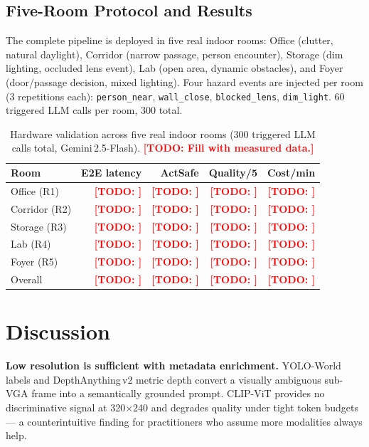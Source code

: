\documentclass[journal]{IEEEtran}
\newcommand{\todo}[1]{\textcolor{red}{\textbf{[TODO: #1]}}}
\begin{document}
\subsection{Five-Room Protocol and Results}

The complete pipeline is deployed in five real indoor rooms:
Office (clutter, natural daylight), Corridor (narrow passage,
person encounter), Storage (dim lighting, occluded lens event),
Lab (open area, dynamic obstacles), and Foyer (door/passage
decision, mixed lighting).
Four hazard events are injected per room (3 repetitions each):
\texttt{person\_near}, \texttt{wall\_close},
\texttt{blocked\_lens}, \texttt{dim\_light}.
60 triggered LLM calls per room, 300 total.

\begin{table}[t]
  \caption{Hardware validation across five real indoor rooms
    (300 triggered LLM calls total, Gemini\,2.5-Flash).
    \todo{Fill with measured data.}}
  \label{tab:h5}
  \centering
  \small
  \begin{tabular}{lrrrr}
    \toprule
    Room & E2E latency & ActSafe & Quality/5 & Cost/min \\
    \midrule
    Office (R1)   & \todo{} & \todo{} & \todo{} & \todo{} \\
    Corridor (R2) & \todo{} & \todo{} & \todo{} & \todo{} \\
    Storage (R3)  & \todo{} & \todo{} & \todo{} & \todo{} \\
    Lab (R4)      & \todo{} & \todo{} & \todo{} & \todo{} \\
    Foyer (R5)    & \todo{} & \todo{} & \todo{} & \todo{} \\
    \midrule
    Overall       & \todo{} & \todo{} & \todo{} & \todo{} \\
    \bottomrule
  \end{tabular}
\end{table}

\section{Discussion}
\label{sec:discussion}

\textbf{Low resolution is sufficient with metadata enrichment.}
YOLO-World labels and DepthAnything\,v2 metric depth convert a
visually ambiguous sub-VGA frame into a semantically grounded
prompt.
CLIP-ViT provides no discriminative signal at 320$\times$240 and
degrades quality under tight token budgets --- a counterintuitive
finding for practitioners who assume more modalities always help.
\end{document}
